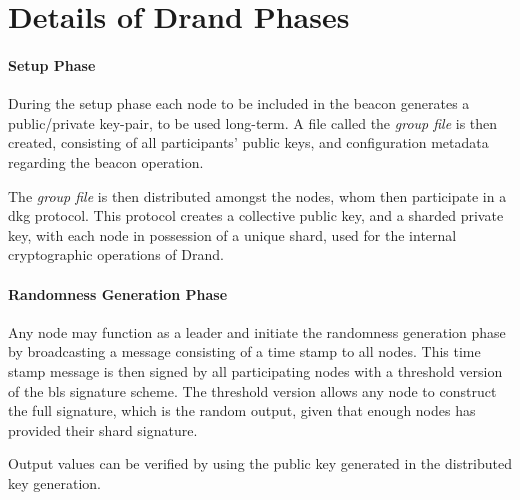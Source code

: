 \section{Details of Drand Phases}%
\label{app:details_of_drand_phases}

\paragraph{Setup Phase}
During the setup phase each node to be included in the beacon generates a public/private key-pair, to be used long-term.
A file called the \textit{group file} is then created, consisting of all participants' public keys, and configuration metadata regarding the beacon operation.

The \textit{group file} is then distributed amongst the nodes, whom then participate in a \gls{dkg} protocol.
This protocol creates a collective public key, and a sharded private key, with each node in possession of a unique shard, used for the internal cryptographic operations of Drand.

\paragraph{Randomness Generation Phase}
Any node may function as a leader and initiate the randomness generation phase by broadcasting a message consisting of a time stamp to all nodes.
This time stamp message is then signed by all participating nodes with a threshold version of the \gls{bls} signature scheme.
The threshold version allows any node to construct the full signature, which is the random output, given that enough nodes has provided their shard signature.

Output values can be verified by using the public key generated in the distributed key generation.
